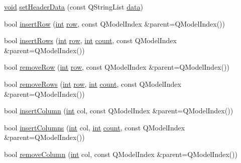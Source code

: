 \begin{DoxyCompactItemize}
\item 
\hyperlink{group___u_a_v_objects_plugin_ga444cf2ff3f0ecbe028adce838d373f5c}{void} \hyperlink{class_qxt_csv_model_a5788519db182175584c73582f943ea93}{set\-Header\-Data} (const Q\-String\-List \hyperlink{glext_8h_a8850df0785e6fbcc2351af3b686b8c7a}{data})
\item 
bool \hyperlink{class_qxt_csv_model_a79d2eb0cc646860b273cb9107e1638bb}{insert\-Row} (\hyperlink{ioapi_8h_a787fa3cf048117ba7123753c1e74fcd6}{int} \hyperlink{glext_8h_a11b277b422822f784ee248b43eee3e1e}{row}, const Q\-Model\-Index \&parent=Q\-Model\-Index())
\item 
bool \hyperlink{class_qxt_csv_model_abd89f279815c4f55515540a6b893fa35}{insert\-Rows} (\hyperlink{ioapi_8h_a787fa3cf048117ba7123753c1e74fcd6}{int} \hyperlink{glext_8h_a11b277b422822f784ee248b43eee3e1e}{row}, \hyperlink{ioapi_8h_a787fa3cf048117ba7123753c1e74fcd6}{int} \hyperlink{glext_8h_a5b40aca7a9682963dd00a8f5aef0a901}{count}, const Q\-Model\-Index \&parent=Q\-Model\-Index())
\item 
bool \hyperlink{class_qxt_csv_model_a702949bc62aef09a4489b69ae4c55f3d}{remove\-Row} (\hyperlink{ioapi_8h_a787fa3cf048117ba7123753c1e74fcd6}{int} \hyperlink{glext_8h_a11b277b422822f784ee248b43eee3e1e}{row}, const Q\-Model\-Index \&parent=Q\-Model\-Index())
\item 
bool \hyperlink{class_qxt_csv_model_a062dc1da9a6ce5d2e7308b47e12854a9}{remove\-Rows} (\hyperlink{ioapi_8h_a787fa3cf048117ba7123753c1e74fcd6}{int} \hyperlink{glext_8h_a11b277b422822f784ee248b43eee3e1e}{row}, \hyperlink{ioapi_8h_a787fa3cf048117ba7123753c1e74fcd6}{int} \hyperlink{glext_8h_a5b40aca7a9682963dd00a8f5aef0a901}{count}, const Q\-Model\-Index \&parent=Q\-Model\-Index())
\item 
bool \hyperlink{class_qxt_csv_model_a35f440fdc31a490d8c49fd0cd1327e70}{insert\-Column} (\hyperlink{ioapi_8h_a787fa3cf048117ba7123753c1e74fcd6}{int} col, const Q\-Model\-Index \&parent=Q\-Model\-Index())
\item 
bool \hyperlink{class_qxt_csv_model_a972e7b7021f61359360b46e7b0acff23}{insert\-Columns} (\hyperlink{ioapi_8h_a787fa3cf048117ba7123753c1e74fcd6}{int} col, \hyperlink{ioapi_8h_a787fa3cf048117ba7123753c1e74fcd6}{int} \hyperlink{glext_8h_a5b40aca7a9682963dd00a8f5aef0a901}{count}, const Q\-Model\-Index \&parent=Q\-Model\-Index())
\item 
bool \hyperlink{class_qxt_csv_model_a585df5622551f1c43f6fad1d37ef671f}{remove\-Column} (\hyperlink{ioapi_8h_a787fa3cf048117ba7123753c1e74fcd6}{int} col, const Q\-Model\-Index \&parent=Q\-Model\-Index())

\end{DoxyCompactItemize}
